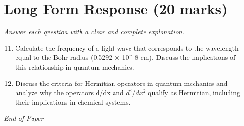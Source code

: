 \documentclass[12pt]{article}
\begin{document}
\section*{Long Form Response (20 marks)}
\textit{Answer each question with a clear and complete explanation.}
\begin{enumerate}[label=\arabic*.]
\setcounter{enumi}{10}
\item Calculate the frequency of a light wave that corresponds to the wavelength equal to the Bohr radius (0.5292 \ensuremath{\times} 10^-8 cm). Discuss the implications of this relationship in quantum mechanics.
\item Discuss the criteria for Hermitian operators in quantum mechanics and analyze why the operators d/dx and $d^2$/$dx^2$ qualify as Hermitian, including their implications in chemical systems.
\end{enumerate}

\vfill
\noindent\textit{End of Paper}
\end{document}
